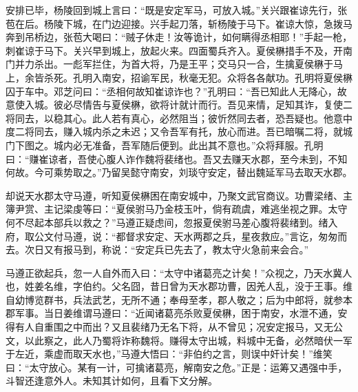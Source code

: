 安排已毕，杨陵回到城上言曰：“既是安定军马，可放入城。”关兴跟崔谅先行，张苞在后。杨陵下城，在门边迎接。兴手起刀落，斩杨陵于马下。崔谅大惊，急拨马奔到吊桥边，张苞大喝曰：“贼子休走！汝等诡计，如何瞒得丞相耶！”手起一枪，刺崔谅于马下。关兴早到城上，放起火来。四面蜀兵齐入。夏侯楙措手不及，开南门并力杀出。一彪军拦住，为首大将，乃是王平；交马只一合，生擒夏侯楙于马上，余皆杀死。孔明入南安，招谕军民，秋毫无犯。众将各各献功。孔明将夏侯楙囚于车中。邓芝问曰：“丞相何故知崔谅诈也？”孔明曰：“吾已知此人无降心，故意使入城。彼必尽情告与夏侯楙，欲将计就计而行。吾见来情，足知其诈，复使二将同去，以稳其心。此人若有真心，必然阻当；彼忻然同去者，恐吾疑也。他意中度二将同去，赚入城内杀之未迟；又令吾军有托，放心而进。吾已暗嘱二将，就城门下图之。城内必无准备，吾军随后便到。此出其不意也。”众将拜服。孔明曰：“赚崔谅者，吾使心腹人诈作魏将裴绪也。吾又去赚天水郡，至今未到，不知何故。今可乘势取之。”乃留吴懿守南安，刘琰守安定，替出魏延军马去取天水郡。

却说天水郡太守马遵，听知夏侯楙困在南安城中，乃聚文武官商议。功曹梁绪、主簿尹赏、主记梁虔等曰：“夏侯驸马乃金枝玉叶，倘有疏虞，难逃坐视之罪。太守何不尽起本部兵以救之？”马遵正疑虑间，忽报夏侯驸马差心腹将裴绪到。绪入府，取公文付马遵，说：“都督求安定、天水两郡之兵，星夜救应。”言讫，匆匆而去。次日又有报马到，称说：“安定兵已先去了，教太守火急前来会合。”

马遵正欲起兵，忽一人自外而入曰：“太守中诸葛亮之计矣！”众视之，乃天水冀人也，姓姜名维，字伯约。父名囧，昔日曾为天水郡功曹，因羌人乱，没于王事。维自幼博览群书，兵法武艺，无所不通；奉母至孝，郡人敬之；后为中郎将，就参本郡军事。当日姜维谓马遵曰：“近闻诸葛亮杀败夏侯楙，困于南安，水泄不通，安得有人自重围之中而出？又且裴绪乃无名下将，从不曾见；况安定报马，又无公文，以此察之，此人乃蜀将诈称魏将。赚得太守出城，料城中无备，必然暗伏一军于左近，乘虚而取天水也，”马遵大悟曰：“非伯约之言，则误中奸计矣！”维笑曰：“太守放心。某有一计，可擒诸葛亮，解南安之危。”正是：运筹又遇强中手，斗智还逢意外人。未知其计如何，且看下文分解。